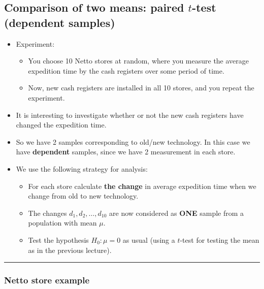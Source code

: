 \documentclass[]{article}
\providecommand{\tightlist}{%
  \setlength{\itemsep}{0pt}\setlength{\parskip}{0pt}}
\begin{document}
\subsection{\texorpdfstring{Comparison of two means: paired \(t\)-test
(dependent
samples)}{Comparison of two means: paired t-test (dependent samples)}}\label{comparison-of-two-means-paired-t-test-dependent-samples}

\begin{itemize}
\tightlist
\item
  Experiment:

  \begin{itemize}
  \tightlist
  \item
    You choose 10 Netto stores at random, where you measure the average
    expedition time by the cash registers over some period of time.
  \item
    Now, new cash registers are installed in all 10 stores, and you
    repeat the experiment.
  \end{itemize}
\item
  It is interesting to investigate whether or not the new cash registers
  have changed the expedition time.
\item
  So we have 2 samples corresponding to old/new technology. In this case
  we have \textbf{dependent} samples, since we have 2 measurement in
  each store.
\item
  We use the following strategy for analysis:

  \begin{itemize}
  \tightlist
  \item
    For each store calculate \textbf{the change} in average expedition
    time when we change from old to new technology.
  \item
    The changes \(d_1,d_2,\ldots,d_{10}\) are now considered as
    \textbf{ONE} sample from a population with mean \(\mu\).
  \item
    Test the hypothesis \(H_0: \mu=0\) as usual (using a \(t\)-test for
    testing the mean as in the previous lecture).
  \end{itemize}
\end{itemize}

\begin{center}\rule{0.5\linewidth}{\linethickness}\end{center}

\subsubsection{Netto store example}\label{netto-store-example}
\end{document}
